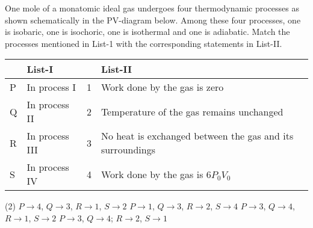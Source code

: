 
\item One mole of a monatomic ideal gas undergoes four thermodynamic processes as shown schematically in the PV-diagram below. Among these four processes, one is isobaric, one is isochoric, one is isothermal and one is adiabatic. Match the processes mentioned in List-1 with the corresponding statements in List-II.

    \begin{center}
    \end{center}

    \begin{center}
        \renewcommand{\arraystretch}{2}
        \begin{table}[h]
            \centering
            \begin{tabular}{p{0.25cm}p{4cm}|p{0.25cm}p{9cm}}
            \hline
            & List-I & & List-II \\
            \hline
            P & In process I & 1 & Work done by the gas is zero \\
            Q & In process II & 2 & Temperature of the gas remains unchanged \\
            R & In process III & 3 & No heat is exchanged between the gas and its surroundings \\
            S & In process IV & 4 & Work done by the gas is \(6P_0V_0\) \\
            \hline
            \end{tabular}
        \end{table}
    \end{center}

    \begin{tasks}(2)
        \task \( P \to 4 \), \( Q \to 3 \), \( R \to 1 \), \( S \to 2 \)
        \task \( P \to 1 \), \( Q \to 3 \), \( R \to 2 \), \( S \to 4 \)
        \task \( P \to 3 \), \( Q \to 4 \), \( R \to 1 \), \( S \to 2 \)
        \task \( P \to 3 \), \( Q \to 4 \); \( R \to 2 \), \( S \to 1 \)
    \end{tasks}